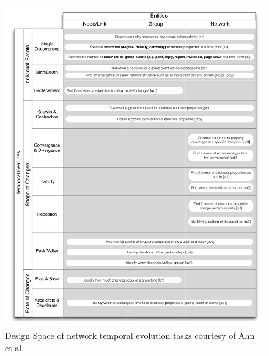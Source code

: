 \begin{figure}[p]
\begin{center}
\includegraphics[width=1\textwidth]{images/ahn2014taskFull}
\caption{Design Space of network temporal evolution tasks courtesy of Ahn et al.\ \cite{ahn2014task}} \label{fig: ahn2014task}
\end{center} \vspace{-0.3cm}
\end{figure}


